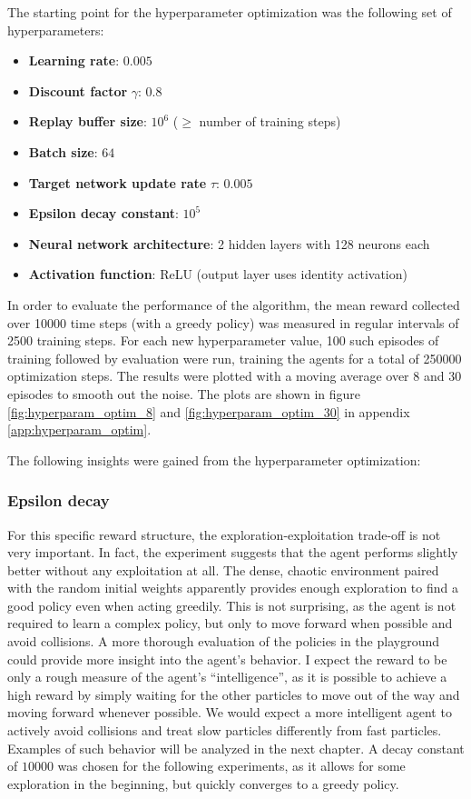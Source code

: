 The starting point for the hyperparameter optimization was the following set of hyperparameters:
\begin{itemize}
    \item \textbf{Learning rate}: $0.005$
    \item \textbf{Discount factor} $\gamma$: $0.8$
    \item \textbf{Replay buffer size}: $10^6$ ($\geq$ number of training steps)
    \item \textbf{Batch size}: $64$
    \item \textbf{Target network update rate} $\tau$: $0.005$
    \item \textbf{Epsilon decay constant}: $10^5$ 
    \item \textbf{Neural network architecture}: 2 hidden layers with 128 neurons each
    \item \textbf{Activation function}: ReLU (output layer uses identity activation)
\end{itemize}
In order to evaluate the performance of the algorithm, the mean reward collected over 10000 time steps (with a greedy policy) was measured in regular intervals of 2500 training steps. For each new hyperparameter value, 100 such episodes of training followed by evaluation were run, training the agents for a total of 250000 optimization steps. The results were plotted with a moving average over 8 and 30 episodes to smooth out the noise. The plots are shown in figure \ref{fig:hyperparam_optim_8} and \ref{fig:hyperparam_optim_30} in appendix \ref{app:hyperparam_optim}.


The following insights were gained from the hyperparameter optimization:
\subsubsection{Epsilon decay}
For this specific reward structure, the exploration-exploitation trade-off is not very important. In fact, the experiment suggests that the agent performs slightly better without any exploitation at all. The dense, chaotic environment paired with the random initial weights apparently provides enough exploration to find a good policy even when acting greedily. This is not surprising, as the agent is not required to learn a complex policy, but only to move forward when possible and avoid collisions. A more thorough evaluation of the policies in the playground could provide more insight into the agent's behavior. I expect the reward to be only a rough measure of the agent's \enquote{intelligence}, as it is possible to achieve a high reward by simply waiting for the other particles to move out of the way and moving forward whenever possible. We would expect a more intelligent agent to actively avoid collisions and treat slow particles differently from fast particles. Examples of such behavior will be analyzed in the next chapter. A decay constant of $10000$ was chosen for the following experiments, as it allows for some exploration in the beginning, but quickly converges to a greedy policy.

